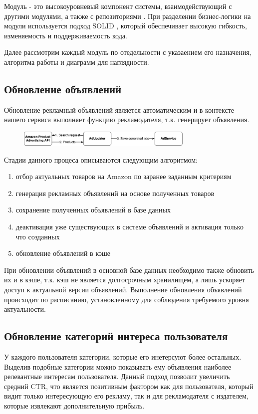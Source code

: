 \documentclass[times]{itmo-student-thesis}
\begin{document}
Модуль - это высокоуровневый компонент системы, взаимодействующий с другими модулями, а также с репозиториями . При разделении бизнес-логики на модули используется подход SOLID \cite{SOLID}, который обеспечивает высокую гибкость, изменяемость и поддерживаемость кода.

Далее рассмотрим каждый модуль по отедельности с указаением его назначения, алгоритма работы и диаграмм для наглядности.

\subsection{Обновление объявлений}

Обновление рекламный объявлений является автоматическим и в контексте нашего сервиса выполняет функцию рекламодателя, т.к. генерирует объявления. 

\begin{figure}[h]
\includegraphics[width=0.75\textwidth]{ad-updater}
\centering
\end{figure}
Стадии данного процеса описываются следующим алгоритмом:
\begin{enumerate}
\item отбор актуальных товаров на Amazon по заранее заданным критериям
\item генерация рекламных объявлений на основе полученных товаров
\item сохранение полученных объявлений в базе данных
\item деактивация уже существующих в системе объявлений и активация только что созданных
\item обновление объявлений в кэше
\end{enumerate}

При обновлении объявлений в основной базе данных необходимо также обновить их и в кэше, т.к. кэш не является долгосрочным хранилищем, а лишь ускоряет доступ к актуальной версии объявлений. Выполнение обновления объявлений происходит по расписанию, установленному для соблюдения требуемого уровня актуальности.

\subsection{Обновление категорий интереса пользователя}

 У каждого пользователя категории, которые его инетерсуют более остальных. Выделив подобные категории можно показывать ему объявления наиболее релевантные интересам пользователя. Данный подход позволит увеличить средний CTR, что является позитивным фактором как для пользователя, который видит только интересующую его рекламу, так и для рекламодателя с издателем, которые извлекают дополнительную прибыль.
 
\end{document}
